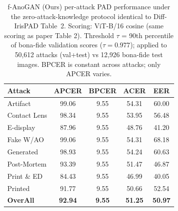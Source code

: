 
\begin{table}[t]
\centering
\small
\caption{f-AnoGAN (Ours) per-attack PAD performance under the zero-attack-knowledge protocol identical to Diff-IrisPAD Table~2. Scoring: ViT-B/16 cosine (same scoring as paper Table 2). Threshold $\tau$ = 90th percentile of bona-fide validation scores ($\tau{=}0.977$); applied to 50{,}612 attacks (val+test) vs 12{,}926 bona-fide test images. BPCER is constant across attacks; only APCER varies.}
\label{tab:fanogan_vitscore}
\begin{tabular}{l|cccc}
\toprule
Attack & APCER & BPCER & ACER & EER \\
\midrule
Artifact & 99.06 & 9.55 & 54.31 & 60.00 \\
Contact Lens & 98.34 & 9.55 & 53.95 & 56.48 \\
E-display & 87.96 & 9.55 & 48.76 & 41.20 \\
Fake W/AO & 99.06 & 9.55 & 54.31 & 68.18 \\
Generated & 98.93 & 9.55 & 54.24 & 60.63 \\
Post-Mortem & 93.39 & 9.55 & 51.47 & 46.87 \\
Print \& ED & 84.43 & 9.55 & 46.99 & 40.05 \\
Printed & 91.77 & 9.55 & 50.66 & 52.54 \\
\midrule
\textbf{OverAll} & \textbf{92.94} & \textbf{9.55} & \textbf{51.25} & \textbf{50.97} \\
\bottomrule
\end{tabular}
\end{table}

